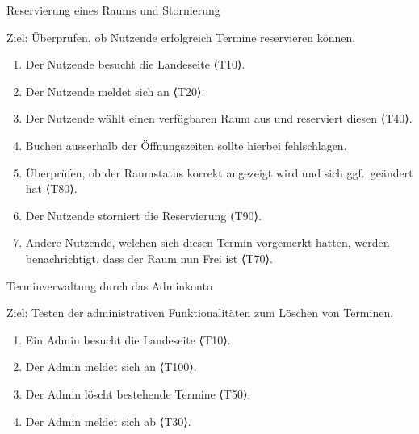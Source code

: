 \begin{scenario}{20}{Reservierung eines Raums und Stornierung}
  \item[Ziel:] Überprüfen, ob Nutzende erfolgreich Termine reservieren können.
  \begin{enumerate}
    \item Der Nutzende besucht die Landeseite ⟨T10⟩.
    \item Der Nutzende meldet sich an ⟨T20⟩.
    \item Der Nutzende wählt einen verfügbaren Raum aus und reserviert diesen ⟨T40⟩.
    \item Buchen ausserhalb der Öffnungszeiten sollte hierbei fehlschlagen.
    \item Überprüfen, ob der Raumstatus korrekt angezeigt wird und sich ggf.\ geändert hat ⟨T80⟩.
    \item Der Nutzende storniert die Reservierung ⟨T90⟩.
    \item Andere Nutzende, welchen sich diesen Termin vorgemerkt hatten, werden benachrichtigt, dass der Raum nun Frei ist ⟨T70⟩.
  \end{enumerate}
\end{scenario}

\begin{scenario}{30}{Terminverwaltung durch das Adminkonto}
  \item[Ziel:] Testen der administrativen Funktionalitäten zum Löschen von Terminen.
  \begin{enumerate}
    \item Ein Admin besucht die Landeseite ⟨T10⟩.
    \item Der Admin meldet sich an ⟨T100⟩.
    \item Der Admin löscht bestehende Termine ⟨T50⟩.
    \item Der Admin meldet sich ab ⟨T30⟩.
  \end{enumerate}
\end{scenario}

\pagebreak

